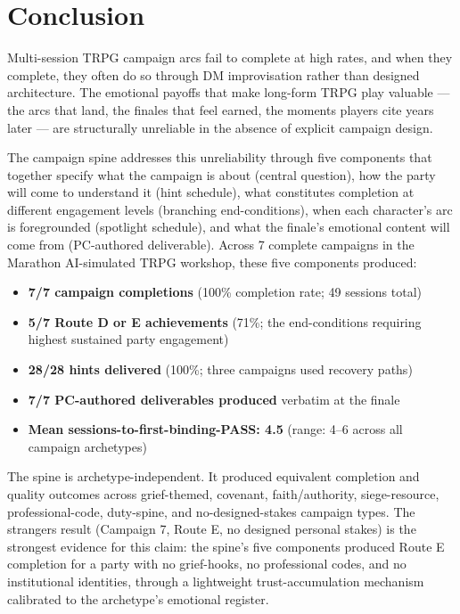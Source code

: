 
\section{Conclusion}
\label{sec:conclusion}

Multi-session TRPG campaign arcs fail to complete at high rates, and when they
complete, they often do so through DM improvisation rather than designed architecture.
The emotional payoffs that make long-form TRPG play valuable --- the arcs that land,
the finales that feel earned, the moments players cite years later --- are structurally
unreliable in the absence of explicit campaign design.

The campaign spine addresses this unreliability through five components that together
specify what the campaign is about (central question), how the party will come to
understand it (hint schedule), what constitutes completion at different engagement
levels (branching end-conditions), when each character's arc is foregrounded
(spotlight schedule), and what the finale's emotional content will come from
(PC-authored deliverable). Across 7 complete campaigns in the Marathon AI-simulated
TRPG workshop, these five components produced:

\begin{itemize}
  \item \textbf{7/7 campaign completions} (100\% completion rate; 49 sessions total)
  \item \textbf{5/7 Route D or E achievements} (71\%; the end-conditions requiring
    highest sustained party engagement)
  \item \textbf{28/28 hints delivered} (100\%; three campaigns used recovery paths)
  \item \textbf{7/7 PC-authored deliverables produced} verbatim at the finale
  \item \textbf{Mean sessions-to-first-binding-PASS: 4.5} (range: 4--6 across
    all campaign archetypes)
\end{itemize}

The spine is archetype-independent. It produced equivalent completion and
quality outcomes across grief-themed, covenant, faith/authority, siege-resource,
professional-code, duty-spine, and no-designed-stakes campaign types. The
strangers result (Campaign 7, Route E, no designed personal stakes) is the
strongest evidence for this claim: the spine's five components produced Route E
completion for a party with no grief-hooks, no professional codes, and no
institutional identities, through a lightweight trust-accumulation mechanism
calibrated to the archetype's emotional register.

